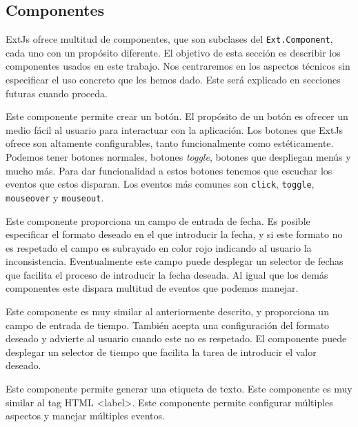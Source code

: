 	\subsection{Componentes}  %
		ExtJs ofrece multitud de componentes, que son subclases del \texttt{Ext.Component}, cada uno con un propósito diferente. El objetivo
		de esta sección es describir los componentes usados en este trabajo. Nos centraremos en los aspectos técnicos sin especificar el uso
		concreto que les hemos dado. Este será explicado en secciones futuras cuando proceda. 
		\begin{description}[style=unboxed,leftmargin=0cm]
			\item[\texttt{Ext.button.Button xtype:button}] Este componente permite crear un botón. El propósito de un botón es ofrecer un
			  medio fácil al usuario para interactuar con la aplicación. Los botones que ExtJs ofrece son altamente configurables, tanto
			  funcionalmente como estéticamente. Podemos tener botones normales, botones \emph{toggle}, botones que despliegan menús y
			  mucho más. Para dar funcionalidad a estos botones tenemos que escuchar los eventos que estos disparan. Los eventos más
			  comunes son \texttt{click}, \texttt{toggle}, \texttt{mouseover} y \texttt{mouseout}.
			\item[\texttt{Ext.form.field.Date xtype:datefield}] Este componente proporciona un campo de entrada de fecha. Es posible
			  especificar el formato deseado en el que introducir la fecha, y si este formato no es respetado el campo es subrayado en
			  color rojo indicando al usuario la inconsistencia. Eventualmente este campo puede desplegar un selector de fechas que
			  facilita el proceso de introducir la fecha deseada. Al igual que los demás componentes este dispara multitud de eventos que
			  podemos manejar.
			\item[\texttt{Ext.form.field.Time xtype:timefield}] Este componente es muy similar al anteriormente descrito, y proporciona
			  un campo de entrada de tiempo. También acepta una configuración del formato deseado y advierte  al usuario cuando este no es
			  respetado. El componente puede desplegar un selector de tiempo que facilita la tarea de introducir el valor deseado.
			\item[\texttt{Ext.form.Label xtype:label}] Este componente permite generar una etiqueta de texto. Este componente es muy
			  similar al tag HTML <label>. Este componente permite configurar múltiples aspectos y manejar múltiples eventos.

\end{description}
